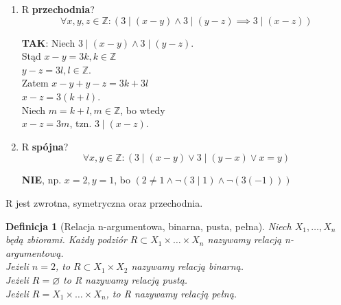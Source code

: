 \documentclass[a5paper,8pt]{article}
\theoremstyle{mythmstyle}
\newtheorem{definition}{Definicja}[section]
\begin{document}
\begin{enumerate}
                \pagebreak
                \item R \textbf{przechodnia}?
                    \begin{equation*}
                        \forall x, y, z \in \mathbb{Z}: ( 3 \mid (x - y) \wedge 3 \mid (y - z) \implies 3 \mid (x - z) )
                    \end{equation*}
                    \begin{center}
                        \textbf{TAK}: Niech $ 3 \mid (x - y) \wedge 3 \mid (y - z) $. \\
                                      Stąd $ x - y = 3k, k \in \mathbb{Z} $ \\
                                      $ y - z = 3l, l \in \mathbb{Z} $. \\
                                      Zatem $ x - y + y - z = 3k + 3l $ \\
                                      $ x - z = 3(k + l) $. \\
                                      Niech $ m = k + l, m \in \mathbb{Z} $, bo wtedy \\
                                      $ x - z = 3m $, tzn. $ 3 \mid (x - z) $.
                    \end{center}

                \item R \textbf{spójna}?
                    \begin{equation*}
                        \forall x, y \in \mathbb{Z}: ( 3 \mid (x - y) \vee 3 \mid (y - x) \vee x = y )
                    \end{equation*}
                    \begin{center}
                        \textbf{NIE}, np. $ x = 2, y = 1 $, bo $ ( 2 \neq 1 \wedge \neg(3 \mid 1) \wedge \neg(3(-1))) $
                    \end{center}
            \end{enumerate}
            R jest zwrotna, symetryczna oraz przechodnia.

            \pagebreak
            \begin{definition}[Relacja n-argumentowa, binarna, pusta, pełna]
                Niech $ X_1, \ldots, X_n $ będą zbiorami. Każdy podziór $ R \subset X_1 \times \ldots \times X_n $
                nazywamy relacją n-argumentową. \\
                Jeżeli $ n = 2 $, to $ R \subset X_1 \times X_2 $
                nazywamy relacją binarną. \\
                Jeżeli $ R = \varnothing $ to R nazywamy relacją pustą. \\
                Jeżeli $ R = X_1 \times \ldots \times X_n $, to R nazywamy relacją pełną.
            \end{definition}
\end{document}
